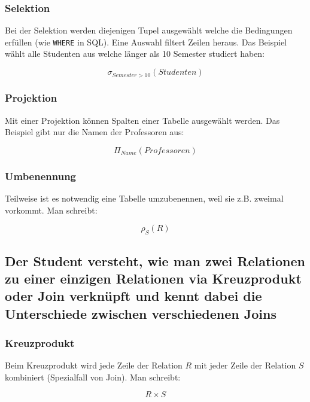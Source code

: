 \subsubsection{Selektion}

Bei der Selektion werden diejenigen Tupel ausgewählt welche die Bedingungen erfüllen (wie \texttt{WHERE} in SQL). Eine Auswahl filtert Zeilen heraus. Das Beispiel wählt alle Studenten aus welche länger als 10 Semester studiert haben:

\begin{equation}
\sigma_{Semester>10}(Studenten)
\end{equation}

\subsubsection{Projektion}

Mit einer Projektion können Spalten einer Tabelle ausgewählt werden. Das Beispiel gibt nur die Namen der Professoren aus:

\begin{equation}
\Pi_{Name}(Professoren)
\end{equation}

\subsubsection{Umbenennung}

Teilweise ist es notwendig eine Tabelle umzubenennen, weil sie z.B. zweimal vorkommt. Man schreibt:

\begin{equation}
\rho_{S}(R)
\end{equation}

\subsection{Der Student versteht, wie man zwei Relationen zu einer einzigen Relationen via Kreuzprodukt oder Join verknüpft und kennt dabei die Unterschiede zwischen verschiedenen Joins}

\subsubsection{Kreuzprodukt}

Beim Kreuzprodukt wird jede Zeile der Relation $R$ mit jeder Zeile der Relation $S$ kombiniert (Spezialfall von Join). Man schreibt:

\begin{equation}
R \times S
\end{equation}

